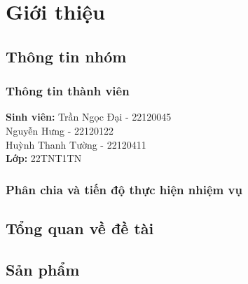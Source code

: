 
\chapter{Giới thiệu}
\label{Chapter 1}

\section{Thông tin nhóm}
\subsection{Thông tin thành viên}
\begin{doublespace}
     \textbf{Sinh viên:}
	Trần Ngọc Đại - 22120045\\
	\hspace*{2.7cm}Nguyễn Hưng - 22120122\\
	\hspace*{2.7cm}Huỳnh Thanh Tường - 22120411\\
	\quad\textbf{Lớp:} 22TNT1TN
\end{doublespace}
\vspace{-0.75cm}
\subsection{Phân chia và tiến độ thực hiện nhiệm vụ}
\section{Tổng quan về đề tài}
\section{Sản phẩm}